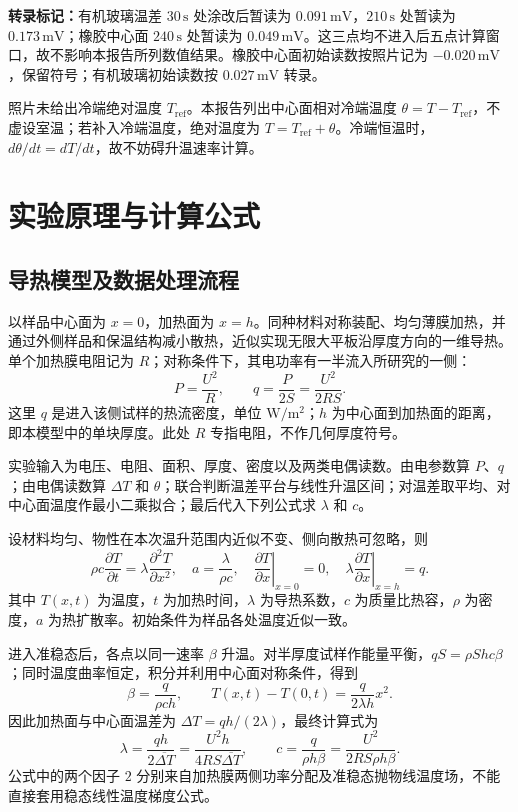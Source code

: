 \documentclass[UTF8,a4paper,11pt]{ctexart}
\newcommand{\unit}[1]{\,\mathrm{#1}}
\begin{document}
\textbf{转录标记：}有机玻璃温差 $30\unit{s}$ 处涂改后暂读为 $0.091\unit{mV}$，$210\unit{s}$ 处暂读为 $0.173\unit{mV}$；橡胶中心面 $240\unit{s}$ 处暂读为 $0.049\unit{mV}$。这三点均不进入后五点计算窗口，故不影响本报告所列数值结果。橡胶中心面初始读数按照片记为 $-0.020\unit{mV}$，保留符号；有机玻璃初始读数按 $0.027\unit{mV}$ 转录。

照片未给出冷端绝对温度 $T_{\mathrm{ref}}$。本报告列出中心面相对冷端温度 $\theta=T-T_{\mathrm{ref}}$，不虚设室温；若补入冷端温度，绝对温度为 $T=T_{\mathrm{ref}}+\theta$。冷端恒温时，$d\theta/dt=dT/dt$，故不妨碍升温速率计算。

\section{实验原理与计算公式}
\subsection{导热模型及数据处理流程}
以样品中心面为 $x=0$，加热面为 $x=h$。同种材料对称装配、均匀薄膜加热，并通过外侧样品和保温结构减小散热，近似实现无限大平板沿厚度方向的一维导热。单个加热膜电阻记为 $R$；对称条件下，其电功率有一半流入所研究的一侧：
\[
P=\frac{U^2}{R},\qquad q=\frac{P}{2S}=\frac{U^2}{2RS}.
\]
这里 $q$ 是进入该侧试样的热流密度，单位 $\mathrm{W/m^2}$；$h$ 为中心面到加热面的距离，即本模型中的单块厚度。此处 $R$ 专指电阻，不作几何厚度符号。

实验输入为电压、电阻、面积、厚度、密度以及两类电偶读数。由电参数算 $P$、$q$；由电偶读数算 $\Delta T$ 和 $\theta$；联合判断温差平台与线性升温区间；对温差取平均、对中心面温度作最小二乘拟合；最后代入下列公式求 $\lambda$ 和 $c$。

设材料均匀、物性在本次温升范围内近似不变、侧向散热可忽略，则
\[
\rho c\frac{\partial T}{\partial t}=\lambda\frac{\partial^2T}{\partial x^2},
\quad a=\frac{\lambda}{\rho c},\quad
\left.\frac{\partial T}{\partial x}\right|_{x=0}=0,\quad
\left.\lambda\frac{\partial T}{\partial x}\right|_{x=h}=q.
\]
其中 $T(x,t)$ 为温度，$t$ 为加热时间，$\lambda$ 为导热系数，$c$ 为质量比热容，$\rho$ 为密度，$a$ 为热扩散率。初始条件为样品各处温度近似一致。

进入准稳态后，各点以同一速率 $\beta$ 升温。对半厚度试样作能量平衡，$qS=\rho Shc\beta$；同时温度曲率恒定，积分并利用中心面对称条件，得到
\[
\beta=\frac{q}{\rho ch},\qquad
T(x,t)-T(0,t)=\frac{q}{2\lambda h}x^2.
\]
因此加热面与中心面温差为 $\Delta T=qh/(2\lambda)$，最终计算式为
\[
\boxed{\lambda=\frac{qh}{2\overline{\Delta T}}=\frac{U^2h}{4RS\overline{\Delta T}}},\qquad
\boxed{c=\frac{q}{\rho h\beta}=\frac{U^2}{2RS\rho h\beta}}.
\]
公式中的两个因子 $2$ 分别来自加热膜两侧功率分配及准稳态抛物线温度场，不能直接套用稳态线性温度梯度公式。
\end{document}
